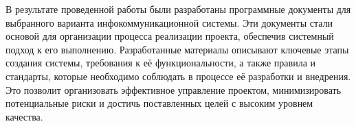 В результате проведенной работы были разработаны программные документы для
выбранного варианта инфокоммуникационной системы. Эти документы стали основой
для организации процесса реализации проекта, обеспечив системный подход к его
выполнению. Разработанные материалы описывают ключевые этапы создания системы,
требования к её функциональности, а также правила и стандарты, которые
необходимо соблюдать в процессе её разработки и внедрения. Это позволит
организовать эффективное управление проектом, минимизировать потенциальные риски
и достичь поставленных целей с высоким уровнем качества.
